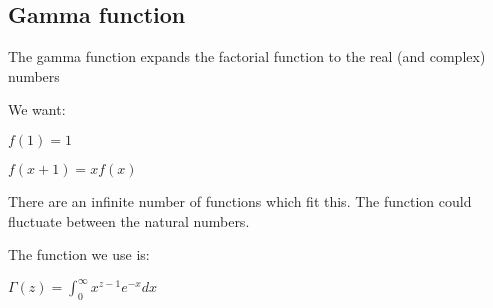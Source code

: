 
\subsection{Gamma function}

The gamma function expands the factorial function to the real (and complex) numbers

We want:

\(f(1)=1\)

\(f(x+1)=xf(x)\)

There are an infinite number of functions which fit this. The function could fluctuate between the natural numbers.

The function we use is:

\(\Gamma (z)=\int_0^\infty x^{z-1}e^{-x}dx\)

